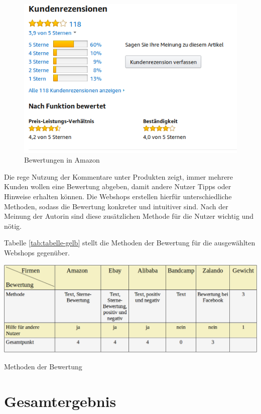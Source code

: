 \begin{figure}[htbp]
	\centering
	\includegraphics[width=1\textwidth]{bilder/bewertung-amazon.png}
	\caption{Bewertungen in Amazon}
	\label{fig:bewertung-amazon}
\end{figure}

Die rege Nutzung der Kommentare unter Produkten zeigt, immer mehrere Kunden wollen eine Bewertung abgeben, damit andere Nutzer Tipps oder Hinweise erhalten können. Die Webshops erstellen hierfür unterschiedliche Methoden, sodass die Bewertung konkreter und intuitiver sind. Nach der Meinung der Autorin sind diese zusätzlichen Methode für die Nutzer wichtig und nötig.

Tabelle \vref{tab:tabelle-gelb} stellt die Methoden der Bewertung für die ausgewählten Webshops gegenüber.

\begin{table}[htbp]
	\centering
	\includegraphics[width=1\textwidth]{bilder/tabelle-gelb.png}
	\caption{Methoden der Bewertung}
	\label{tab:tabelle-gelb}
\end{table}

\newpage


\section{Gesamtergebnis}

